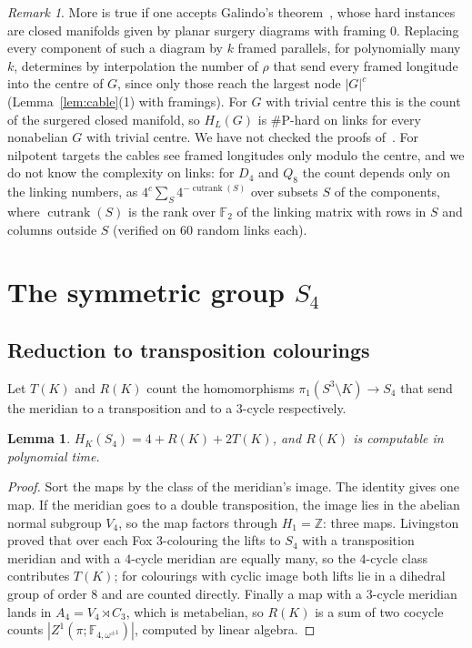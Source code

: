 \documentclass[11pt]{article}
\newtheorem{lemma}[theorem]{Lemma}
\theoremstyle{definition}
\theoremstyle{remark}
\newtheorem{remark}[theorem]{Remark}
\newcommand{\F}{\mathbb{F}}
\newcommand{\Z}{\mathbb{Z}}
\newcommand{\sharpP}{\#\mathrm{P}}
\begin{document}
\begin{remark}\label{rem:galindo}
More is true if one accepts Galindo's theorem~\cite{Gal26}, whose hard
instances are closed manifolds given by planar surgery diagrams with framing
$0$. Replacing every component of such a diagram by $k$ framed parallels, for
polynomially many $k$, determines by interpolation the number of $\rho$ that
send every framed longitude into the centre of $G$, since only those reach the
largest node $|G|^c$ (Lemma~\ref{lem:cable}(1) with framings). For $G$ with
trivial centre this is the count of the surgered closed manifold, so
$H_L(G)$ is $\sharpP$-hard on links for every nonabelian $G$ with trivial
centre. We have not checked the proofs of~\cite{Gal26}. For nilpotent targets
the cables see framed longitudes only modulo the centre, and we do not know the
complexity on links: for $D_4$ and $Q_8$ the count depends only on the linking
numbers, as $4^c\sum_S4^{-\operatorname{cutrank}(S)}$ over subsets $S$ of the
components, where $\operatorname{cutrank}(S)$ is the rank over $\F_2$ of the
linking matrix with rows in $S$ and columns outside $S$ (verified on 60 random
links each).
\end{remark}

\section{The symmetric group \texorpdfstring{$S_4$}{S4}}\label{sec:s4}

\subsection{Reduction to transposition colourings}

Let $T(K)$ and $R(K)$ count the homomorphisms $\pi_1(S^3\setminus K)\to S_4$
that send the meridian to a transposition and to a $3$-cycle respectively.

\begin{lemma}\label{lem:split}
$H_K(S_4)=4+R(K)+2T(K)$, and $R(K)$ is computable in polynomial time.
\end{lemma}

\begin{proof}
Sort the maps by the class of the meridian's image. The identity gives one
map. If the meridian goes to a double transposition, the image lies in the
abelian normal subgroup $V_4$, so the map factors through $H_1=\Z$: three
maps. Livingston \cite[Thm.~9]{Liv95} proved that over each Fox
$3$-colouring the lifts to $S_4$ with a transposition meridian and with a
$4$-cycle meridian are equally many, so the $4$-cycle class contributes
$T(K)$; for colourings with cyclic image both lifts lie in a dihedral group
of order 8 and are counted directly. Finally a map with a $3$-cycle meridian
lands in $A_4=V_4\rtimes C_3$, which is metabelian, so $R(K)$ is a sum of two
cocycle counts $|Z^1(\pi;\F_{4,\omega^{\pm1}})|$, computed by linear algebra.
\end{proof}
\end{document}
